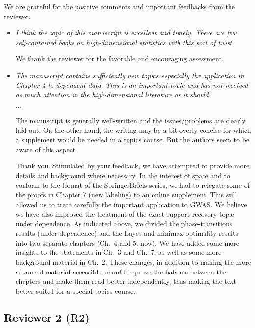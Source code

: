 \documentclass[11pt]{article}
\begin{document}
 We are grateful for the positive comments and important feedbacks from the reviewer. 
 
 \begin{itemize}
  \item {\em I think the topic of this manuscript is excellent and timely. There are few self-contained books on high-dimensional statistics with this sort of twist.}
  
  We thank the reviewer for the favorable and encouraging assessment.  
  
  \item {\em  The manuscript contains sufficiently new topics especially the application in Chapter 4 to dependent data. This is an important topic and has not received as much attention in the high-dimensional literature as it should.
  
  \centerline{$\cdots$}
  
  The manuscript is generally well-written and the issues/problems are clearly laid out. On the other hand, the writing may be a bit overly concise for which a supplement would be needed in a topics course. But the authors seem to be aware of this aspect.}
  
  Thank you.  Stimulated by your feedback, we have attempted to provide more details and background where necessary.  In the interest of space and to 
  conform to the format of the SpringerBriefs series, we had to relegate some of the proofs in Chapter 7 (new labeling) to an online supplement.  This still 
  allowed us to treat carefully the important application to GWAS.  We believe we have also improved the treatment of the exact support recovery topic under 
  dependence.  As indicated above, we divided the phase-transitions results (under dependence) and the Bayes and minimax optimality results into 
  two separate chapters (Ch.\ 4 and 5, now).   We have added some more insights to the statements in Ch.\ 3 and Ch.\ 7, as well as some more 
  background material in Ch.\ 2.  
  These changes, in addition to making the more advanced material accessible, should improve the balance between the chapters and make them read better independently, thus making the text better suited for a special topics course.
 
  \end{itemize}
  
  \subsection{Reviewer 2 (R2)}
  
\end{document}
